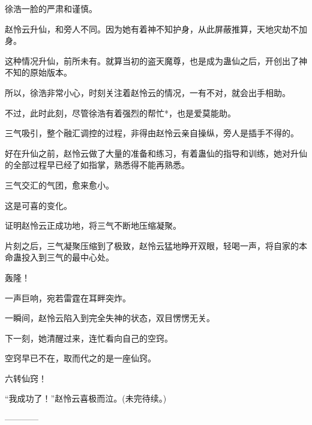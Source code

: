 \begin{this_body}
徐浩一脸的严肃和谨慎。

赵怜云升仙，和旁人不同。因为她有着神不知护身，从此屏蔽推算，天地灾劫不加身。

这种情况升仙，前所未有。就算当初的盗天魔尊，也是成为蛊仙之后，开创出了神不知的原始版本。

所以，徐浩非常小心，时刻关注着赵怜云的情况，一有不对，就会出手相助。

不过，此时此刻，尽管徐浩有着强烈的帮忙*，也是爱莫能助。

三气吸引，整个融汇调控的过程，非得由赵怜云亲自操纵，旁人是插手不得的。

好在升仙之前，赵怜云做了大量的准备和练习，有着蛊仙的指导和训练，她对升仙的全部过程早已经了如指掌，熟悉得不能再熟悉。

三气交汇的气团，愈来愈小。

这是可喜的变化。

证明赵怜云正成功地，将三气不断地压缩凝聚。

片刻之后，三气凝聚压缩到了极致，赵怜云猛地睁开双眼，轻喝一声，将自家的本命蛊投入到三气的最中心处。

轰隆！

一声巨响，宛若雷霆在耳畔突炸。

一瞬间，赵怜云陷入到完全失神的状态，双目愣愣无关。

下一刻，她清醒过来，连忙看向自己的空窍。

空窍早已不在，取而代之的是一座仙窍。

六转仙窍！

“我成功了！”赵怜云喜极而泣。(未完待续。)

------------

\end{this_body}

